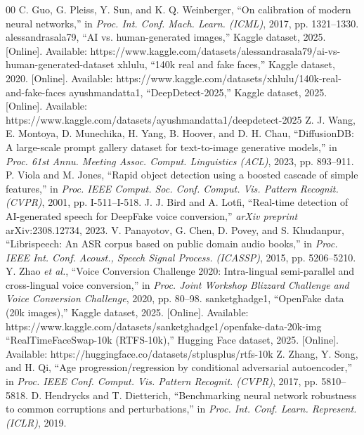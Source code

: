 \documentclass[conference]{IEEEtran}
\begin{document}
\begin{thebibliography}{00}
 C. Guo, G. Pleiss, Y. Sun, and K. Q. Weinberger, ``On calibration of modern neural networks,'' in \emph{Proc. Int. Conf. Mach. Learn. (ICML)}, 2017, pp. 1321--1330.
 alessandrasala79, ``AI vs. human-generated images,'' Kaggle dataset, 2025. [Online]. Available: https://www.kaggle.com/datasets/alessandrasala79/ai-vs-human-generated-dataset
 xhlulu, ``140k real and fake faces,'' Kaggle dataset, 2020. [Online]. Available: https://www.kaggle.com/datasets/xhlulu/140k-real-and-fake-faces
 ayushmandatta1, ``DeepDetect-2025,'' Kaggle dataset, 2025. [Online]. Available: https://www.kaggle.com/datasets/ayushmandatta1/deepdetect-2025
 Z. J. Wang, E. Montoya, D. Munechika, H. Yang, B. Hoover, and D. H. Chau, ``DiffusionDB: A large-scale prompt gallery dataset for text-to-image generative models,'' in \emph{Proc. 61st Annu. Meeting Assoc. Comput. Linguistics (ACL)}, 2023, pp. 893--911.
 P. Viola and M. Jones, ``Rapid object detection using a boosted cascade of simple features,'' in \emph{Proc. IEEE Comput. Soc. Conf. Comput. Vis. Pattern Recognit. (CVPR)}, 2001, pp. I-511--I-518.
 J. J. Bird and A. Lotfi, ``Real-time detection of AI-generated speech for DeepFake voice conversion,'' \emph{arXiv preprint} arXiv:2308.12734, 2023.
 V. Panayotov, G. Chen, D. Povey, and S. Khudanpur, ``Librispeech: An ASR corpus based on public domain audio books,'' in \emph{Proc. IEEE Int. Conf. Acoust., Speech Signal Process. (ICASSP)}, 2015, pp. 5206--5210.
 Y. Zhao \emph{et al.}, ``Voice Conversion Challenge 2020: Intra-lingual semi-parallel and cross-lingual voice conversion,'' in \emph{Proc. Joint Workshop Blizzard Challenge and Voice Conversion Challenge}, 2020, pp. 80--98.
 sanketghadge1, ``OpenFake data (20k images),'' Kaggle dataset, 2025. [Online]. Available: https://www.kaggle.com/datasets/sanketghadge1/openfake-data-20k-img
 ``RealTimeFaceSwap-10k (RTFS-10k),'' Hugging Face dataset, 2025. [Online]. Available: https://huggingface.co/datasets/stplusplus/rtfs-10k
 Z. Zhang, Y. Song, and H. Qi, ``Age progression/regression by conditional adversarial autoencoder,'' in \emph{Proc. IEEE Conf. Comput. Vis. Pattern Recognit. (CVPR)}, 2017, pp. 5810--5818.
 D. Hendrycks and T. Dietterich, ``Benchmarking neural network robustness to common corruptions and perturbations,'' in \emph{Proc. Int. Conf. Learn. Represent. (ICLR)}, 2019.
\end{thebibliography}
\end{document}
